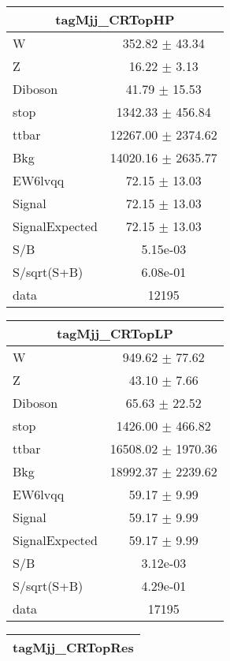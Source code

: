\begin{table}
\centering
\small
\begin{tabular}{|l|c|}
\hline
 \multicolumn{2}{|c|}{tagMjj\_CRTopHP}\\ \hline
W & 352.82 $\pm$ 43.34\\
Z & 16.22 $\pm$ 3.13\\
Diboson & 41.79 $\pm$ 15.53\\
stop & 1342.33 $\pm$ 456.84\\
ttbar & 12267.00 $\pm$ 2374.62\\
\hline
Bkg & 14020.16 $\pm$ 2635.77\\
\hline
EW6lvqq & 72.15 $\pm$ 13.03\\
\hline
Signal & 72.15 $\pm$ 13.03\\
SignalExpected & 72.15 $\pm$ 13.03\\
\hline
S/B & 5.15e-03\\
S/sqrt(S+B) & 6.08e-01\\
\hline
data & 12195\\ \hline
\end{tabular}
\begin{tabular}{|l|c|}
\hline
 \multicolumn{2}{|c|}{tagMjj\_CRTopLP}\\ \hline
W & 949.62 $\pm$ 77.62\\
Z & 43.10 $\pm$ 7.66\\
Diboson & 65.63 $\pm$ 22.52\\
stop & 1426.00 $\pm$ 466.82\\
ttbar & 16508.02 $\pm$ 1970.36\\
\hline
Bkg & 18992.37 $\pm$ 2239.62\\
\hline
EW6lvqq & 59.17 $\pm$ 9.99\\
\hline
Signal & 59.17 $\pm$ 9.99\\
SignalExpected & 59.17 $\pm$ 9.99\\
\hline
S/B & 3.12e-03\\
S/sqrt(S+B) & 4.29e-01\\
\hline
data & 17195\\ \hline
\end{tabular}
\begin{tabular}{|l|c|}
\hline
 \multicolumn{2}{|c|}{tagMjj\_CRTopRes}\\ \hline

\end{tabular}
\end{table}
